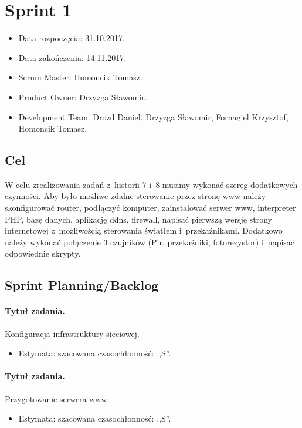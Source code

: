 \section{Sprint 1}
	\begin{itemize}
		\item Data rozpoczęcia: 31.10.2017.
		\item Data zakończenia: 14.11.2017.
		\item Scrum Master: Homoncik Tomasz.
		\item Product Owner: Drzyzga Sławomir.
		\item Development Team: Drozd Daniel, Drzyzga Sławomir, Fornagiel Krzysztof, Homoncik Tomasz.
	\end{itemize}
\subsection{Cel} 

	
	W celu zrealizowania zadań z~historii 7 i~8 musimy wykonać szereg dodatkowych czynności. Aby było możliwe zdalne sterowanie przez stronę www należy skonfigurować router, podłączyć komputer, zainstalować serwer www, interpreter PHP, bazę danych, aplikację ddns, firewall, napisać pierwszą wersję strony internetowej z~możliwością sterowania światłem i~przekaźnikami. Dodatkowo należy wykonać połączenie 3 czujników (Pir, przekaźniki, fotorezystor) i~napisać odpowiednie skrypty.
	
	
	
\subsection{Sprint Planning/Backlog}
	
	\paragraph{Tytuł zadania.} Konfiguracja infrastruktury sieciowej.
	\begin{itemize}
		\item Estymata: szacowana czasochłonność: ,,S''.
	\end{itemize}
	
	\paragraph{Tytuł zadania.} Przygotowanie serwera www.
	\begin{itemize}
		\item Estymata: szacowana czasochłonność: ,,S''.
	\end{itemize}
	
